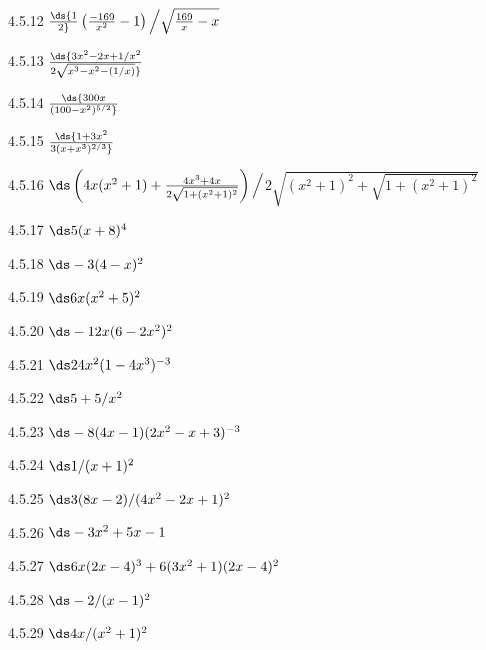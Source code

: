 \begin{Answer}{4.5.12}
$\ds{1\over2}\left({-169\over x^2}-1\right)\Big/\sqrt{{169\over x}-x}$
\end{Answer}
\begin{Answer}{4.5.13}
$ \ds{3x^2-2x+1/x^2\over 2\sqrt{x^3-x^2-(1/x)}}$
\end{Answer}
\begin{Answer}{4.5.14}
$ \ds{300 x \over(100-x^2)^{5/2}}$
\end{Answer}
\begin{Answer}{4.5.15}
$ \ds{ 1 + 3 x^2\over3(x+x^3)^{2/3}}$
\end{Answer}
\begin{Answer}{4.5.16}
$\ds \left(4x(x^2+1)+{4x^3+4x\over2\sqrt{1+(x^2+1)^2}}\right)\Big/$\hfill\break$2\sqrt{(x^2+1)^2+\sqrt{1+(x^2+1)^2}}$
\end{Answer}
\begin{Answer}{4.5.17}
$\ds 5(x+8)^4$
\end{Answer}
\begin{Answer}{4.5.18}
$\ds -3(4-x)^2$
\end{Answer}
\begin{Answer}{4.5.19}
$\ds 6x(x^2+5)^2$
\end{Answer}
\begin{Answer}{4.5.20}
$\ds -12x(6-2x^2)^2$
\end{Answer}
\begin{Answer}{4.5.21}
$\ds 24x^2(1-4x^3)^{-3}$
\end{Answer}
\begin{Answer}{4.5.22}
$\ds 5+5/x^2$
\end{Answer}
\begin{Answer}{4.5.23}
$\ds -8(4x-1)(2x^2-x+3)^{-3}$
\end{Answer}
\begin{Answer}{4.5.24}
$\ds 1/(x+1)^2$
\end{Answer}
\begin{Answer}{4.5.25}
$\ds 3(8x-2)/(4x^2-2x+1)^2$
\end{Answer}
\begin{Answer}{4.5.26}
$\ds -3x^2+5x-1$
\end{Answer}
\begin{Answer}{4.5.27}
$\ds 6x(2x-4)^3+6(3x^2+1)(2x-4)^2$
\end{Answer}
\begin{Answer}{4.5.28}
$\ds -2/(x-1)^2$
\end{Answer}
\begin{Answer}{4.5.29}
$\ds 4x/(x^2+1)^2$
\end{Answer}
